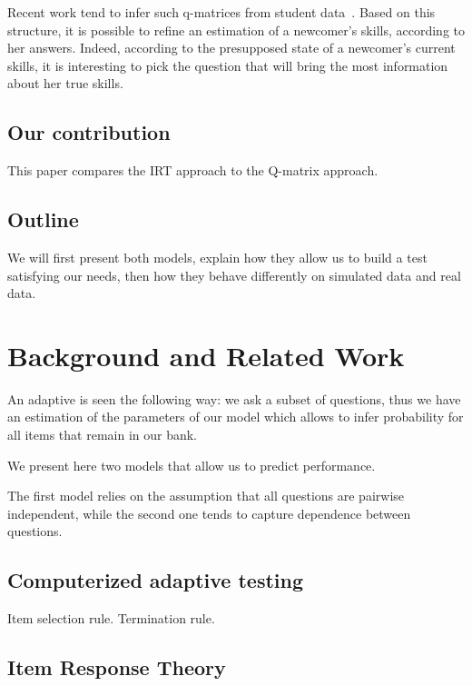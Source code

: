 \documentclass{sig-alternate}
\begin{document}
Recent work tend to infer such q-matrices from student data~\cite{Desmarais2011}. Based on this structure, it is possible to refine an estimation of a newcomer's skills, according to her answers. Indeed, according to the presupposed state of a newcomer's current skills, it is interesting to pick the question that will bring the most information about her true skills.

\subsection{Our contribution}

This paper compares the IRT approach to the Q-matrix approach.

\subsection{Outline}

We will first present both models, explain how they allow us to build a test satisfying our needs, then how they behave differently on simulated data and real data.

\section{Background and Related Work}

An adaptive is seen the following way: we ask a subset of questions, thus we have an estimation of the parameters of our model which allows to infer probability for all items that remain in our bank.

We present here two models that allow us to predict performance.

The first model relies on the assumption that all questions are pairwise independent, while the second one tends to capture dependence between questions.

\subsection{Computerized adaptive testing}

Item selection rule. Termination rule.

\subsection{Item Response Theory}

\end{document}
